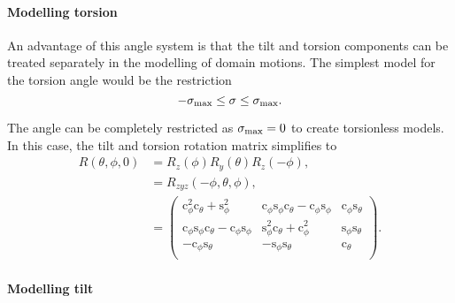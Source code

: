 


\paragraph{Modelling torsion}

An advantage of this angle system is that the tilt and torsion components can be treated separately in the modelling of domain motions.
The simplest model for the torsion angle would be the restriction
\begin{equation} \label{eq: torsion angle restriction}
    -\sigma_\textrm{max} \le \sigma \le \sigma_\textrm{max} .
\end{equation}

The angle can be completely restricted as $\sigma_\textrm{max} = 0$ to create torsionless models.
In this case, the tilt and torsion rotation matrix simplifies to
\begin{subequations}    %
\begin{align}
    R(\theta, \phi, 0)
        &= R_z(\phi)R_y(\theta)R_z(-\phi) , \\
        &= R_{zyz}(-\phi, \theta, \phi) , \\
        &= \begin{pmatrix}
            \mathrm{c}^2_\phi \mathrm{c}_\theta + \mathrm{s}^2_\phi                                 & \mathrm{c}_\phi \mathrm{s}_\phi \mathrm{c}_\theta - \mathrm{c}_{\phi} \mathrm{s}_\phi & \mathrm{c}_\phi \mathrm{s}_\theta \\
            \mathrm{c}_{\phi} \mathrm{s}_\phi \mathrm{c}_\theta - \mathrm{c}_\phi \mathrm{s}_{\phi} & \mathrm{s}^2_\phi \mathrm{c}_\theta + \mathrm{c}^2_\phi                               & \mathrm{s}_\phi \mathrm{s}_\theta \\
            -\mathrm{c}_{\phi} \mathrm{s}_\theta                                                    & -\mathrm{s}_{\phi} \mathrm{s}_\theta                                                  & \mathrm{c}_\theta \\
        \end{pmatrix} . \label{eq: R matrix torsionless}
\end{align}
\end{subequations}



\paragraph{Modelling tilt}

